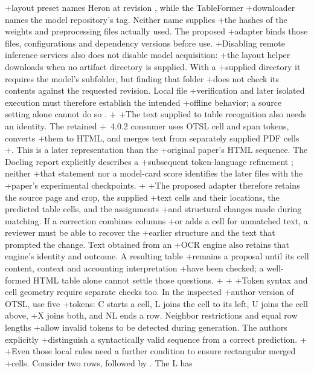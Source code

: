 +layout preset names Heron at revision , while the TableFormer
+downloader names the model repository's  tag. Neither name supplies
+the hashes of the weights and preprocessing files actually used. The proposed
+adapter binds those files, configurations and dependency versions before use.
+Disabling remote inference services also does not disable model acquisition:
+the layout helper downloads when no artifact directory is supplied. With a
+supplied directory it requires the model's subfolder, but finding that folder
+does not check its contents against the requested revision. Local file
+verification and later isolated execution must therefore establish the intended
+offline behavior; a source setting alone cannot do so \citep{doclingpinned2026}.
+
+The text supplied to table recognition also needs an identity. The retained
+~4.0.2 consumer uses OTSL cell and span tokens, converts
+them to HTML, and merges text from separately supplied PDF cells
+\citep{tableformerconsumer2026}. This is a later representation than the
+original paper's HTML sequence. The Docling report explicitly describes a
+subsequent token-language refinement \citep[Section 3]{nassar2024}; neither
+that statement nor a model-card score identifies the later files with the
+paper's experimental checkpoints.
+
+The proposed adapter therefore retains the source page and crop, the supplied
+text cells and their locations, the predicted table cells, and the assignments
+and structural changes made during matching. If a correction combines columns
+or adds a cell for unmatched text, a reviewer must be able to recover the
+earlier structure and the text that prompted the change. Text obtained from an
+OCR engine also retains that engine's identity and outcome. A resulting table
+remains a proposal until its cell content, context and accounting interpretation
+have been checked; a well-formed HTML table alone cannot settle those questions.
+
+
+Token syntax and cell geometry require separate checks too. In the inspected
+author version of OTSL, \citet[Sections 4.1--4.3]{lysak2023otsl} use five
+tokens: C starts a cell, L joins the cell to its left, U joins the cell above,
+X joins both, and NL ends a row. Neighbor restrictions and equal row lengths
+allow invalid tokens to be detected during generation. The authors explicitly
+distinguish a syntactically valid sequence from a correct prediction.
+
+Even those local rules need a further condition to ensure rectangular merged
+cells. Consider two rows,  followed by . The L has

